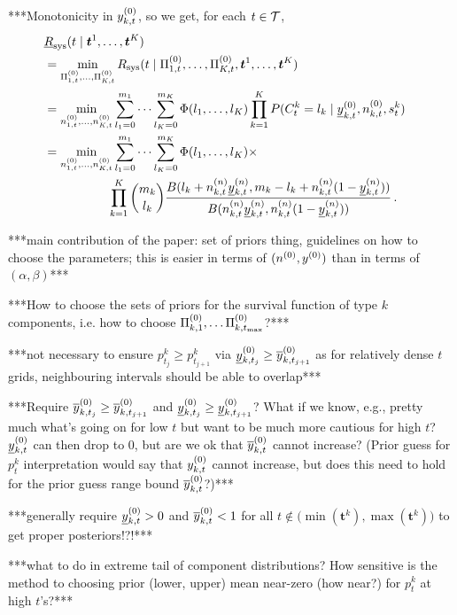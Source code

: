 \documentclass[authoryear, 12pt, a4paper]{elsarticle}
\newcommand{\bs}[1]{\boldsymbol{#1}}
\renewcommand{\vec}[1]{{\bs#1}}
\newcommand{\ul}[1]{\underline{#1}}
\newcommand{\Rsys}{R_\text{sys}}
\newcommand{\lRsys}{\ul{R}_\text{sys}}
\def\tmax{t_\text{max}}
\begin{document}
***Monotonicity in $y^{(0)}_{k,t}$, so we get, for each $t \in {\cal T}$,
\begin{align*}
\lefteqn{\lRsys(t \mid \vec{t}^1, \ldots, \vec{t}^K)}\\
 &= \min_{\PtZi{1}, \ldots, \PtZi{K}} \Rsys(t \mid \PtZi{1}, \ldots, \PtZi{K}, \vec{t}^1, \ldots, \vec{t}^K) \\
 &= \min_{\nz_{1,t},\ldots,\nz_{K,t}} 
    \sum_{l_1=0}^{m_1} \cdots \sum_{l_K=0}^{m_K} \Phi(l_1, \ldots, l_K)
                                                 \prod_{k=1}^K P(C^k_t = l_k \mid \yktzl, \nktz, s^k_t) \\
 &= \min_{\nz_{1,t},\ldots,\nz_{K,t}} 
    \sum_{l_1=0}^{m_1} \cdots \sum_{l_K=0}^{m_K} \Phi(l_1, \ldots, l_K) \times \\ & \hspace*{12ex}
    \prod_{k=1}^K {m_k \choose l_k} \frac{B(l_k + \nn_{k,t}\ynl_{k,t}, m_k - l_k + \nn_{k,t}(1-\ynl_{k,t}))}
                                         {B(\nn_{k,t}\ynl_{k,t}, \nn_{k,t}(1-\ynl_{k,t}))} \,.
\end{align*}

***main contribution of the paper:
set of priors thing,
guidelines on how to choose the parameters;
this is easier in terms of $(n^{(0)}, y^{(0)})$ than in terms of $(\alpha, \beta)$***

***How to choose the sets of priors for the survival function of type $k$ components,
i.e. how to choose $\PkZi{1}, \ldots \PkZi{\tmax}$?***

***not necessary to ensure $p^k_{t_j} \ge p^k_{t_{j+1}}$ via $\yzl_{k,t_j} \ge \yzu_{k,t_{j+1}}$
as for relatively dense $t$ grids, neighbouring intervals should be able to overlap***

***Require $\overline{y}^{(0)}_{k,t_j} \ge \overline{y}^{(0)}_{k,t_{j+1}}$ and $\yzl_{k,t_j} \ge \yzl_{k,t_{j+1}}$?
What if we know, e.g., pretty much what's going on for low $t$
but want to be much more cautious for high $t$?
$\yktzl$ can then drop to 0, but are we ok that $\overline{y}^{(0)}_{k,t}$ cannot increase?
(Prior guess for $p^k_t$ interpretation would say that $y^{(0)}_{k,t}$ cannot increase,
but does this need to hold for the prior guess range bound $\overline{y}^{(0)}_{k,t}$?)***

***generally require $\yktzl > 0$ and $\overline{y}^{(0)}_{k,t} < 1$ for all $t \not\in \big(\min(\vec{t}^k), \max(\vec{t}^k)\big)$
to get proper posteriors!?!***

***what to do in extreme tail of component distributions?
How sensitive is the method to choosing prior (lower, upper) mean near-zero (how near?) for $p^k_t$ at high $t$'s?***
\end{document}
